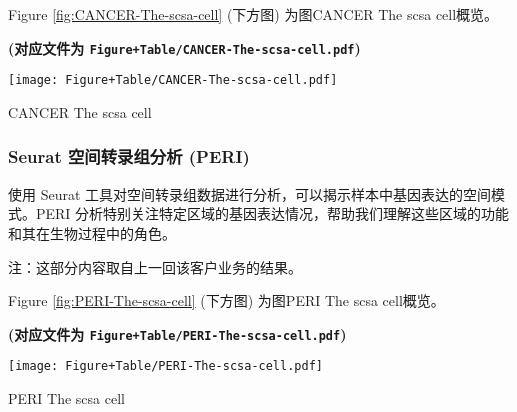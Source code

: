 \documentclass[
]{article}
\begin{document}
\begin{center}\vspace{1.5cm}\end{center}

Figure \ref{fig:CANCER-The-scsa-cell} (下方图) 为图CANCER The scsa cell概览。

\textbf{(对应文件为 \texttt{Figure+Table/CANCER-The-scsa-cell.pdf})}

\def\@captype{figure}
\begin{center}
\texttt{[image: Figure+Table/CANCER-The-scsa-cell.pdf]}
\caption{CANCER The scsa cell}\label{fig:CANCER-The-scsa-cell}
\end{center}

\begin{center}\vspace{1.5cm}\end{center}

\hypertarget{seurat-ux7a7aux95f4ux8f6cux5f55ux7ec4ux5206ux6790-peri}{%
\subsubsection{Seurat 空间转录组分析 (PERI)}\label{seurat-ux7a7aux95f4ux8f6cux5f55ux7ec4ux5206ux6790-peri}}

使用 Seurat 工具对空间转录组数据进行分析，可以揭示样本中基因表达的空间模式。PERI 分析特别关注特定区域的基因表达情况，帮助我们理解这些区域的功能和其在生物过程中的角色。

注：这部分内容取自上一回该客户业务的结果。

\begin{center}\vspace{1.5cm}\end{center}

Figure \ref{fig:PERI-The-scsa-cell} (下方图) 为图PERI The scsa cell概览。

\textbf{(对应文件为 \texttt{Figure+Table/PERI-The-scsa-cell.pdf})}

\def\@captype{figure}
\begin{center}
\texttt{[image: Figure+Table/PERI-The-scsa-cell.pdf]}
\caption{PERI The scsa cell}\label{fig:PERI-The-scsa-cell}
\end{center}

\begin{center}\vspace{1.5cm}\end{center}
\end{document}
